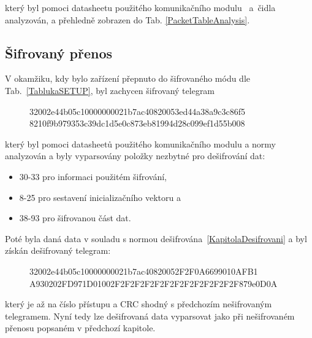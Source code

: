 který byl pomoci datasheetu použitého komunikačního modulu~\cite{ModulIQRF} a~čidla~\cite{CidloWeptech} analyzován, a přehledně zobrazen do Tab. \ref{PacketTableAnalysis}.

\subsection{Šifrovaný přenos}

V okamžiku, kdy bylo zařízení přepnuto do šifrovaného módu dle Tab.~\ref{TablukaSETUP}, byl zachycen šifrovaný telegram

\begin{figure}[!ht]
\begin{centerverbatim}
	32002e44b05c10000000021b7ac40820053ed44a38a9c3c86f5
	8210f9b979353c39dc1d5e0c873eb81994d28c099ef1d55b008
\end{centerverbatim}
\end{figure}
\vspace{-5pt}

který byl pomoci datasheetů použitého komunikačního modulu \cite{ModulIQRF} a normy~\cite{Norma1,NormaFIPS} analyzován a byly vyparsovány položky nezbytné pro dešifrování dat:
\begin{itemize}
	\item 30-33 pro informaci použitém šifrování,
	\item 8-25 pro sestavení inicializačního vektoru a
	\item 38-93 pro šifrovanou část dat.
\end{itemize}

Poté byla daná data v souladu s normou \cite{NormaFIPS} dešifrována~\ref{KapitolaDesifrovani} a byl získán dešifrovaný telegram:

\begin{figure}[!ht]
\begin{centerverbatim}
	32002e44b05c10000000021b7ac40820052F2F0A6699010AFB1
	A930202FD971D01002F2F2F2F2F2F2F2F2F2F2F2F2F879e0D0A
\end{centerverbatim}
\end{figure}

který je až na číslo přístupu a CRC shodný s předchozím nešifrovaným telegramem. Nyní tedy lze dešifrovaná data vyparsovat jako při nešifrovaném přenosu popsaném v předchozí kapitole.

